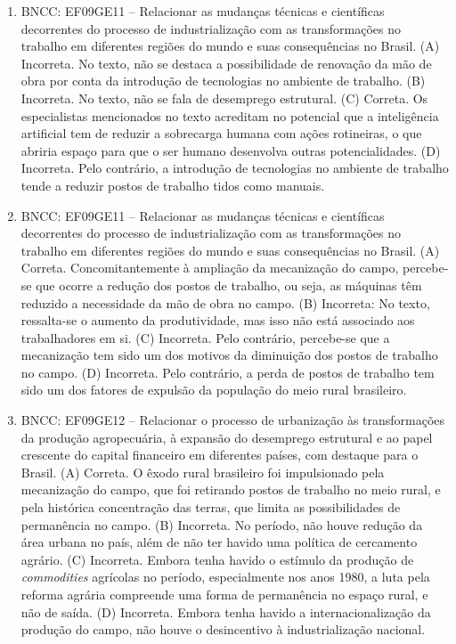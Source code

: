 
\begin{enumerate}
\item
BNCC: EF09GE11 -- Relacionar as mudanças técnicas e científicas
decorrentes do processo de industrialização com as transformações no
trabalho em diferentes regiões do mundo e suas consequências no Brasil. (A) Incorreta. No texto, não se destaca a possibilidade de renovação da mão de obra por conta da introdução de tecnologias no ambiente de trabalho. (B) Incorreta. No texto, não se fala de desemprego estrutural. (C) Correta. Os especialistas mencionados no texto acreditam no potencial que a inteligência artificial tem de reduzir a sobrecarga humana com ações rotineiras, o que abriria espaço para que o ser humano desenvolva outras potencialidades. (D) Incorreta. Pelo contrário, a introdução de tecnologias no ambiente de trabalho tende a reduzir postos de trabalho tidos como manuais.

\item
BNCC: EF09GE11 -- Relacionar as mudanças técnicas e científicas
decorrentes do processo de industrialização com as transformações no
trabalho em diferentes regiões do mundo e suas consequências no Brasil. (A) Correta. Concomitantemente à ampliação da mecanização do campo, percebe-se que ocorre a redução dos postos de trabalho, ou seja, as máquinas têm reduzido a necessidade da mão de obra no campo. (B) Incorreta: No texto, ressalta-se o aumento da produtividade, mas isso não está associado aos trabalhadores em si. (C) Incorreta. Pelo contrário, percebe-se que a mecanização tem sido um dos motivos da diminuição dos postos de trabalho no campo. (D) Incorreta. Pelo contrário, a perda de postos de trabalho tem sido um dos fatores de expulsão da população do meio rural brasileiro.

\item
BNCC: EF09GE12 -- Relacionar o processo de urbanização às transformações
da produção agropecuária, à expansão do desemprego estrutural e ao papel
crescente do capital financeiro em diferentes países, com destaque para
o Brasil.
(A) Correta. O êxodo rural brasileiro foi impulsionado pela mecanização
do campo, que foi retirando postos de trabalho no meio rural, e pela
histórica concentração das terras, que limita as possibilidades de
permanência no campo.
(B) Incorreta. No período, não houve redução da área urbana no país, além
de não ter havido uma política de cercamento agrário.
(C) Incorreta. Embora tenha havido o estímulo da produção de
\emph{commodities} agrícolas no período, especialmente nos anos 1980, a
luta pela reforma agrária compreende uma forma de permanência no espaço
rural, e não de saída.
(D) Incorreta. Embora tenha havido a internacionalização da produção do
campo, não houve o desincentivo à industrialização nacional.
\end{enumerate}

